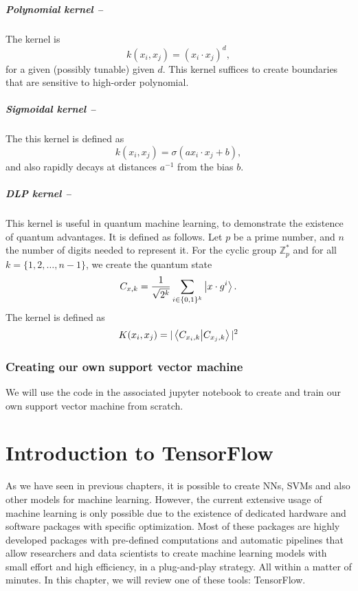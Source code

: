 \documentclass[]{report}
\begin{document}
\paragraph{Polynomial kernel --} The kernel is 
\begin{equation}
k(x_i, x_j) = (x_i \cdot x_j)^d, 
\end{equation}
for a given (possibly tunable) given $d$. This kernel suffices to create boundaries that are sensitive to high-order polynomial. 

\paragraph{Sigmoidal kernel --} The this kernel is defined as
\begin{equation}
k(x_i, x_j) = \sigma(a x_i \cdot x_j + b), 
\end{equation}
and also rapidly decays at distances $a^{-1}$ from the bias $b$. 

\paragraph{DLP kernel --} This kernel is useful in quantum machine learning, to demonstrate the existence of quantum advantages. It is defined as follows. Let $p$ be a prime number, and $n$ the number of digits needed to represent it. For the cyclic group $\mathbb Z^*_p$ and for all $k = \{1, 2, \ldots, n - 1\}$, we create the quantum state
\begin{equation}
C_{x, k} = \frac{1}{\sqrt{2^k}} \sum_{i \in \{0, 1\}^k} \ket{x \cdot g^i}.
\end{equation}
The kernel is defined as
\begin{equation}
K(x_i, x_j) = \vert \braket{C_{x_i, k}}{C_{x_j, k}} \vert^2
\end{equation}
\subsection{Creating our own support vector machine}

We will use the code in the associated jupyter notebook to create and train our own support vector machine from scratch. 

\chapter{Introduction to TensorFlow}

As we have seen in previous chapters, it is possible to create NNs, SVMs and also other models for machine learning. However, the current extensive usage of machine learning is only possible due to the existence of dedicated hardware and software packages with specific optimization. Most of these packages are highly developed packages with pre-defined computations and automatic pipelines that allow researchers and data scientists to create machine learning models with small effort and high efficiency, in a plug-and-play strategy. All within a matter of minutes. In this chapter, we will review one of these tools: TensorFlow. 
\end{document}
